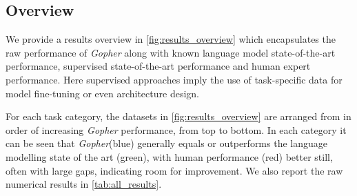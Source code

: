 \documentclass[11pt, a4paper, logo, internal, copyright, nonumbering]{deepmind}
\newcommand{\gopher}{\textit{Gopher}\xspace}
\begin{document}
\subsection{Overview}
We provide a results overview in \autoref{fig:results_overview} which encapsulates the raw performance of \gopher along with known language model state-of-the-art performance, supervised state-of-the-art performance and human expert performance. Here supervised approaches imply the use of task-specific data for model fine-tuning or even architecture design.

For each task category, the datasets in \autoref{fig:results_overview} are arranged from in order of increasing \gopher performance, from top to bottom.
In each category it can be seen that \gopher (blue) generally equals or outperforms the language modelling state of the art (green), with human performance (red) better still, often with large gaps, indicating room for improvement. We also report the raw numerical results in \autoref{tab:all_results}.
\end{document}
